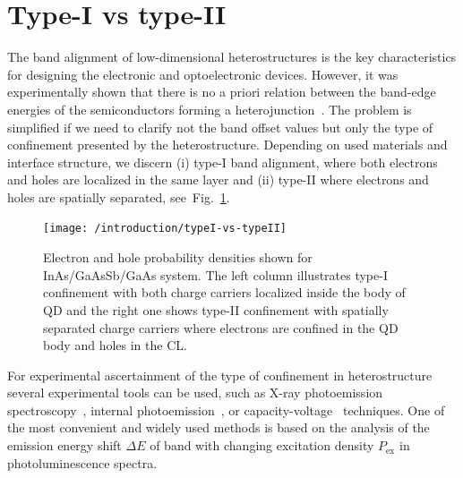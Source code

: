 \documentclass[
a4paper, %
11pt, %
onecolumn, %
openany, %
oldfontcommands,
]{memoir}
\begin{document}
\section{Type-I vs type-II}
The band alignment of low-dimensional heterostructures is the key characteristics for designing the electronic and optoelectronic devices. However, it was experimentally shown that there is no a priori relation between the band-edge energies of the semiconductors forming a heterojunction~\cite{Kroemer1985}. The problem is simplified if we need to clarify not the band offset values but only the type of confinement presented by the heterostructure. Depending on used materials and interface structure, we discern (i) type-I band alignment, where both electrons and holes are localized in the same layer and (ii) type-II where electrons and holes are spatially separated, see~Fig.~\ref{fig:intr:typeI_vs_typeII}.
%
\begin{figure}
	\centering
	\texttt{[image: /introduction/typeI-vs-typeII]}
	\caption{Electron and hole probability densities shown for InAs/GaAsSb/GaAs system. The left column illustrates type-I confinement with both charge carriers localized inside the body of QD and the right one shows type-II confinement with spatially separated charge carriers where electrons are confined in the QD body and holes in the CL.}
	\label{fig:intr:typeI_vs_typeII}
\end{figure}

For experimental ascertainment of the type of confinement in heterostructure several experimental tools can be used, such as X-ray photoemission spectroscopy~\cite{Lin2014}, internal photoemission~\cite{Zhang_2012}, or capacity-voltage~\cite{Brounkov_1996} techniques. One of the most convenient and widely used methods is based on the analysis of the emission energy shift $\Delta E$ of band with changing excitation density $P_\mathrm{ex}$ in photoluminescence spectra. %
\end{document}
